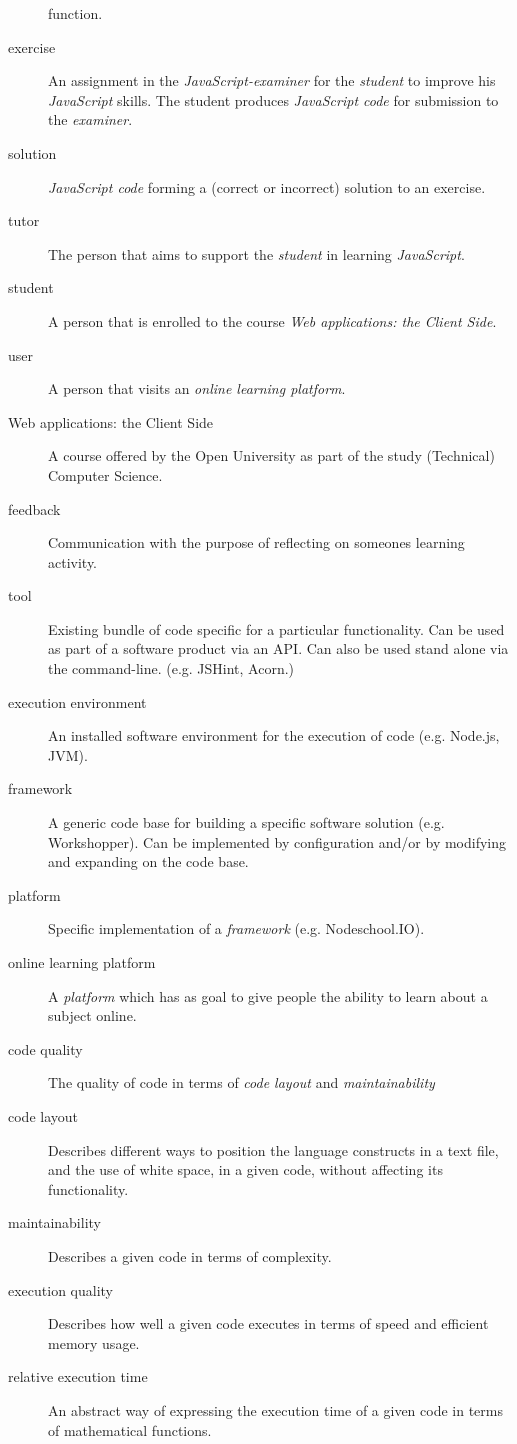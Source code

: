 \documentclass{article}
\begin{document}
\begin{description}
    function.
  \item[exercise] An assignment in the {\em JavaScript-examiner} for the {\em
    student} to improve his {\em JavaScript} skills. The student produces
    {\em JavaScript code} for submission to the {\em examiner}.
  \item[solution] {\em JavaScript code} forming a (correct or incorrect)
    solution to an exercise.
  \item[tutor] The person that aims to support the {\em student} in learning
    {\em JavaScript}.
  \item[student] A person that is enrolled to the course {\em Web applications:
    the Client Side}.
  \item[user] A person that visits an {\em online learning platform}.
  \item[Web applications: the Client Side] A course offered by the Open
    University as part of the study (Technical) Computer Science.
  \item[feedback] Communication with the purpose of reflecting on someones 
    learning activity.
  \item[tool] Existing bundle of code specific for a particular
    functionality. Can be used as part of a software product via an API. Can
    also be used stand alone via the command-line. (e.g. JSHint, Acorn.)
  \item[execution environment] An installed software environment for the
    execution of code (e.g. Node.js, JVM).
  \item[framework] A generic code base for building a specific software
    solution (e.g. Workshopper). Can be implemented by configuration and/or by
    modifying and expanding on the code base.
  \item[platform] Specific implementation of a {\em framework}
    (e.g. Nodeschool.IO).
  \item[online learning platform] A {\em platform} which has as goal to give
    people the ability to learn about a subject online.
  \item[code quality] The quality of code in terms of {\em code layout} and
    {\em maintainability}
  \item[code layout] Describes different ways to position the language
    constructs in a text file, and the use of white space, in a given code,
    without affecting its functionality.
  \item[maintainability] Describes a given code in terms of complexity.
  \item[execution quality] Describes how well a given code executes in terms of
    speed and efficient memory usage.
  \item[relative execution time] An abstract way of expressing the execution
    time of a given code in terms of mathematical functions.
\end{description}
\end{document}
